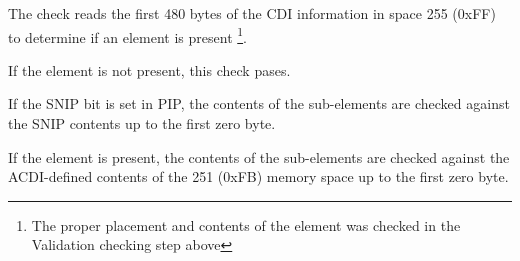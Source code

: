 The check reads the first 480 bytes of the CDI information in space 255 (0xFF) to 
determine if an  element is present
\footnote{The proper placement and contents of the  element
was checked in the Validation checking step above}.  

If the  element is not present, this check pases.

If the SNIP bit is set in PIP, the contents of the 
sub-elements are checked against the SNIP contents
up to the first zero byte.

If the  element is present, the contents of the 
 sub-elements are checked against the ACDI-defined
contents of the 251 (0xFB) memory space up to the first zero byte.

  
